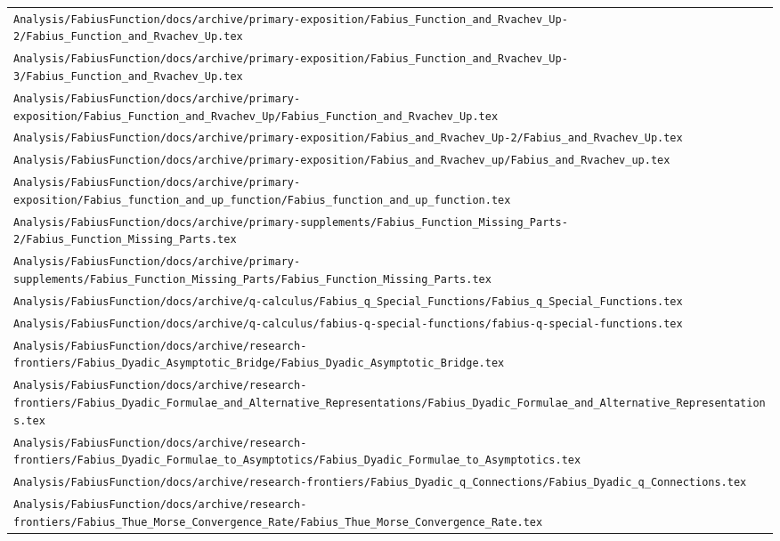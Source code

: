 \begin{longtable}{@{}p{\textwidth}@{}}
\nolinkurl{Analysis/FabiusFunction/docs/archive/primary-exposition/Fabius_Function_and_Rvachev_Up-2/Fabius_Function_and_Rvachev_Up.tex}\\[0.12em]
\nolinkurl{Analysis/FabiusFunction/docs/archive/primary-exposition/Fabius_Function_and_Rvachev_Up-3/Fabius_Function_and_Rvachev_Up.tex}\\[0.12em]
\nolinkurl{Analysis/FabiusFunction/docs/archive/primary-exposition/Fabius_Function_and_Rvachev_Up/Fabius_Function_and_Rvachev_Up.tex}\\[0.12em]
\nolinkurl{Analysis/FabiusFunction/docs/archive/primary-exposition/Fabius_and_Rvachev_Up-2/Fabius_and_Rvachev_Up.tex}\\[0.12em]
\nolinkurl{Analysis/FabiusFunction/docs/archive/primary-exposition/Fabius_and_Rvachev_up/Fabius_and_Rvachev_up.tex}\\[0.12em]
\nolinkurl{Analysis/FabiusFunction/docs/archive/primary-exposition/Fabius_function_and_up_function/Fabius_function_and_up_function.tex}\\[0.12em]
\nolinkurl{Analysis/FabiusFunction/docs/archive/primary-supplements/Fabius_Function_Missing_Parts-2/Fabius_Function_Missing_Parts.tex}\\[0.12em]
\nolinkurl{Analysis/FabiusFunction/docs/archive/primary-supplements/Fabius_Function_Missing_Parts/Fabius_Function_Missing_Parts.tex}\\[0.12em]
\nolinkurl{Analysis/FabiusFunction/docs/archive/q-calculus/Fabius_q_Special_Functions/Fabius_q_Special_Functions.tex}\\[0.12em]
\nolinkurl{Analysis/FabiusFunction/docs/archive/q-calculus/fabius-q-special-functions/fabius-q-special-functions.tex}\\[0.12em]
\nolinkurl{Analysis/FabiusFunction/docs/archive/research-frontiers/Fabius_Dyadic_Asymptotic_Bridge/Fabius_Dyadic_Asymptotic_Bridge.tex}\\[0.12em]
\nolinkurl{Analysis/FabiusFunction/docs/archive/research-frontiers/Fabius_Dyadic_Formulae_and_Alternative_Representations/Fabius_Dyadic_Formulae_and_Alternative_Representations.tex}\\[0.12em]
\nolinkurl{Analysis/FabiusFunction/docs/archive/research-frontiers/Fabius_Dyadic_Formulae_to_Asymptotics/Fabius_Dyadic_Formulae_to_Asymptotics.tex}\\[0.12em]
\nolinkurl{Analysis/FabiusFunction/docs/archive/research-frontiers/Fabius_Dyadic_q_Connections/Fabius_Dyadic_q_Connections.tex}\\[0.12em]
\nolinkurl{Analysis/FabiusFunction/docs/archive/research-frontiers/Fabius_Thue_Morse_Convergence_Rate/Fabius_Thue_Morse_Convergence_Rate.tex}\\[0.12em]

\end{longtable}
